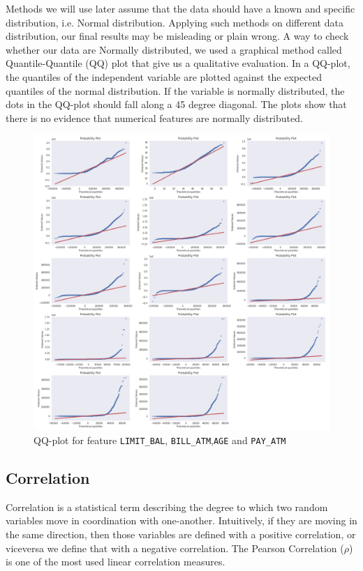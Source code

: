 \documentclass{article}
\begin{document}
Methods we will use later assume that the data should have a known and specific distribution, i.e. Normal distribution. Applying such methods on different data distribution, our final results may be misleading or plain wrong. A way to check whether our data are Normally distributed, we used a graphical method called Quantile-Quantile (QQ) plot that give us a qualitative evaluation. In a QQ-plot, the quantiles of the independent variable are plotted against the expected quantiles of the normal distribution. If the variable is normally distributed, the dots in the QQ-plot should fall along a 45 degree diagonal. The plots show that there is no evidence that numerical features are normally distributed.
\begin{figure}[h]
\centering
\includegraphics[width=1\textwidth]{QQplot.png}
\caption{QQ-plot for feature \texttt{LIMIT\_BAL}, \texttt{BILL\_ATM},\texttt{AGE} and \texttt{PAY\_ATM}}
\end{figure}


\subsection{Correlation} %
Correlation is a statistical term describing the degree to which two random variables move in coordination with one-another. Intuitively, if they are moving in the same direction, then those variables are defined with a positive correlation, or viceversa we define that with a negative correlation. The Pearson Correlation ($\rho$) is one
of the most used linear correlation measures.
\end{document}

